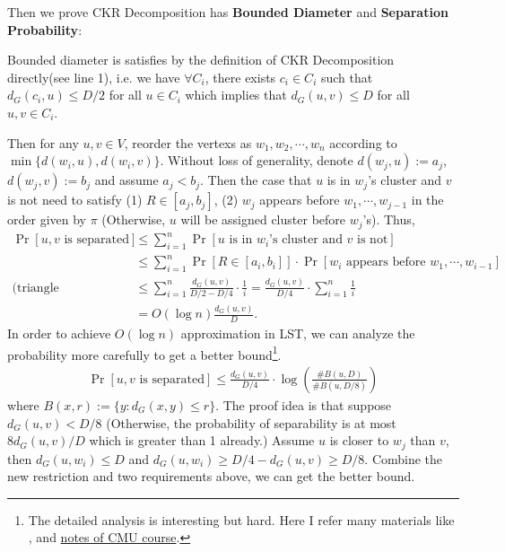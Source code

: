 \begin{answer}
\begin{enumerate}[label=\alph*).]
        Then we  prove CKR Decomposition has \textbf{Bounded Diameter} and \textbf{Separation Probability}:
        
        Bounded diameter is satisfies by the definition of CKR Decomposition directly(see line 1), i.e. we have 
            $\forall C_i$, there exists $c_i \in C_i$ such that $d_G(c_i, u) \leq D/2$ for all $u \in C_i$ which implies that $d_G(u, v) \leq D$ for all $u, v \in C_i$.
        
        Then for any $u, v \in V$, reorder the vertexs as $w_1, w_2, \cdots, w_n$ according to $\min\{d(w_i, u), d(w_i, v)\}$.
        Without loss of generality, denote $d(w_j, u) := a_j$, $d(w_j, v) := b_j$ and assume $a_j < b_j$.
        Then the case that $u$ is in $w_j$'s cluster and $v$ is not need to satisfy (1) $R \in [a_j, b_j]$, (2) $w_j$ appears before $w_{1}, \cdots, w_{j-1}$ in the order given by $\pi$ (Otherwise, $u$ will be assigned cluster before $w_j$'s). Thus, 
        \begin{align*}
            \Pr\left[u,v \text{ is separated}\right] &\le \sum_{i=1}^{n} \Pr\left[ \text{$u$ is in $w_i$'s cluster and $v$ is not}\right] \\
            &\le \sum_{i=1}^{n} \Pr\left[R \in [a_i, b_i]\right] \cdot \Pr\left[\text{$w_i$ appears before $w_{1}, \cdots, w_{i-1}$}\right] \\
            \text{(triangle inequality.)} &\le \sum_{i=1}^{n} \frac{d_G(u, v)}{D/2 - D/4} \cdot \frac{1}{i} = \frac{d_G(u, v)}{D/4} \cdot \sum_{i=1}^{n} \frac{1}{i} \\
            &= O(\log n)\frac{d_G(u, v)}{D}.
        \end{align*}
        In order to achieve $O(\log n)$ approximation in LST, we can analyze the probability more carefully to get a better bound\footnote{The detailed analysis is interesting but hard. Here I refer many materials like \cite{CKR_Decomposition}, \cite{mendel2009fastckrpartitionssparse} and \href{https://www.cs.cmu.edu/~15850/}{notes of CMU course}.}. 
        \begin{align}
            \label{eq:ckr-separation}
            \Pr[u, v \text{ is separated}] \le \frac{d_G(u,v)}{D/4} \cdot \log\left(\frac{\# B(u, D)}{\# B(u, D/8)}\right)
        \end{align}
        where $B(x, r):= \{y: d_G(x,y) \le r\}$. The proof idea is that suppose $d_G(u,v) < D/8$ (Otherwise, the probability of separability is at most $8d_G(u,v)/D$ which is greater than 1 already.)
        Assume $u$ is closer to $w_j$ than $v$, then $d_G(u, w_i) \le D$ and $d_G(u, w_i) \ge D/4 - d_G(u, v) \ge D/8$. Combine the new restriction and two requirements above, we can get the better bound.


\end{enumerate}
\end{answer}
